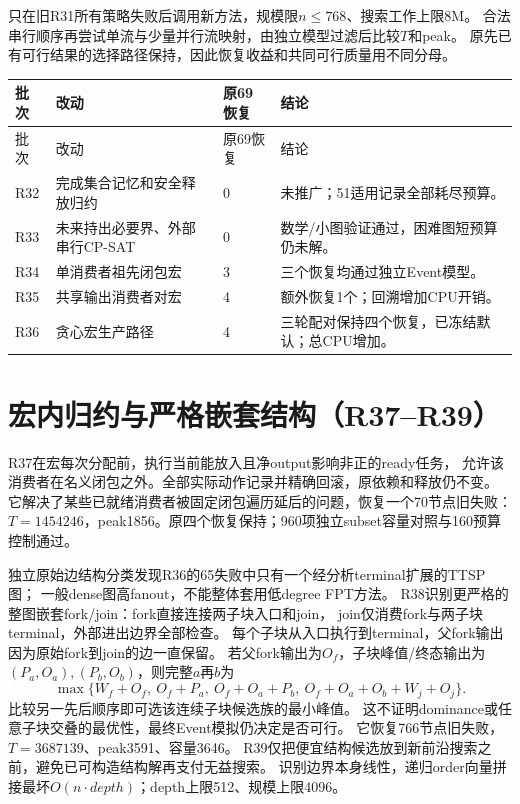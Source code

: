 \documentclass[UTF8,fontset=fandol,11pt]{ctexart}
\begin{document}
只在旧R31所有策略失败后调用新方法，规模限$n\le768$、搜索工作上限8M。
合法串行顺序再尝试单流与少量并行流映射，由独立模型过滤后比较$T$和peak。
原先已有可行结果的选择路径保持，因此恢复收益和共同可行质量用不同分母。

\begin{longtable}{L{0.8cm}L{5.1cm}L{1.9cm}L{6.0cm}}
\toprule 批次 & 改动 & 原69恢复 & 结论 \\\midrule\endfirsthead
\toprule 批次 & 改动 & 原69恢复 & 结论 \\\midrule\endhead
R32 & 完成集合记忆和安全释放归约 & 0 & 未推广；51适用记录全部耗尽预算。\\
R33 & 未来持出必要界、外部串行CP-SAT & 0 & 数学/小图验证通过，困难图短预算仍未解。\\
R34 & 单消费者祖先闭包宏 & 3 & 三个恢复均通过独立Event模型。\\
R35 & 共享输出消费者对宏 & 4 & 额外恢复1个；回溯增加CPU开销。\\
R36 & 贪心宏生产路径 & 4 & 三轮配对保持四个恢复，已冻结默认；总CPU增加。\\
\bottomrule
\end{longtable}

\section{宏内归约与严格嵌套结构（R37--R39）}
R37在宏每次分配前，执行当前能放入且净output影响非正的ready任务，
允许该消费者在名义闭包之外。全部实际动作记录并精确回滚，原依赖和释放仍不变。
它解决了某些已就绪消费者被固定闭包遍历延后的问题，恢复一个70节点旧失败：
$T=1454246$，peak1856。原四个恢复保持；960项独立subset容量对照与160预算控制通过。

独立原始边结构分类发现R36的65失败中只有一个经分析terminal扩展的TTSP图；
一般dense图高fanout，不能整体套用低degree FPT方法。
R38识别更严格的整图嵌套fork/join：fork直接连接两子块入口和join，
join仅消费fork与两子块terminal，外部进出边界全部检查。
每个子块从入口执行到terminal，父fork输出因为原始fork到join的边一直保留。
若父fork输出为$O_f$，子块峰值/终态输出为$(P_a,O_a),(P_b,O_b)$，则完整$a$再$b$为
\[
\max\{W_f+O_f,\ O_f+P_a,\ O_f+O_a+P_b,
\ O_f+O_a+O_b+W_j+O_j\}.
\]
比较另一先后顺序即可选该连续子块候选族的最小峰值。
这不证明dominance或任意子块交叠的最优性，最终Event模拟仍决定是否可行。
它恢复766节点旧失败，$T=3687139$、peak3591、容量3646。
R39仅把便宜结构候选放到新前沿搜索之前，避免已可构造结构解再支付无益搜索。
识别边界本身线性，递归order向量拼接最坏$O(n\cdot depth)$；depth上限512、规模上限4096。
\end{document}
